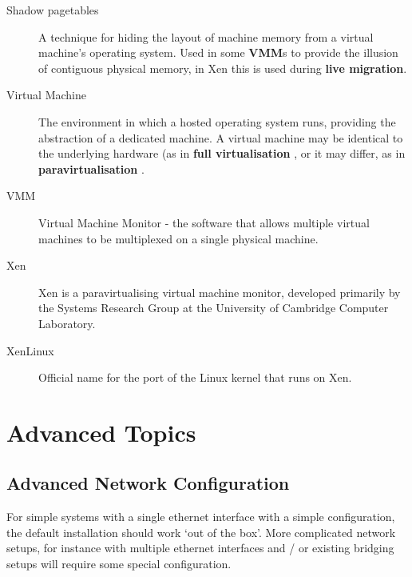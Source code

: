 \documentclass[11pt,twoside,final,openright]{xenstyle}
\begin{document}
{\begin{description}
\item[Shadow pagetables]   A technique for hiding the layout of machine
                           memory from a virtual machine's operating
                           system.  Used in some {\bf VMM}s to provide
                           the illusion of contiguous physical memory,
                           in Xen this is used during
                           {\bf live migration}.

\item[Virtual Machine]     The environment in which a hosted operating
                           system runs, providing the abstraction of a
                           dedicated machine.  A virtual machine may
                           be identical to the underlying hardware (as
                           in { \bf full virtualisation }, or it may
                           differ, as in { \bf paravirtualisation }.

\item[VMM]                 Virtual Machine Monitor - the software that
                           allows multiple virtual machines to be
                           multiplexed on a single physical machine.

\item[Xen]                 Xen is a paravirtualising virtual machine
                           monitor, developed primarily by the
                           Systems Research Group at the University
                           of Cambridge Computer Laboratory.

\item[XenLinux]            Official name for the port of the Linux kernel
                           that runs on Xen.

\end{description}

\part{Advanced Topics}

\chapter{Advanced Network Configuration}

For simple systems with a single ethernet interface with a simple
configuration, the default installation should work `out of the
box'.  More complicated network setups, for instance with multiple
ethernet interfaces and / or existing bridging setups will require
some special configuration.

}
\end{document}
